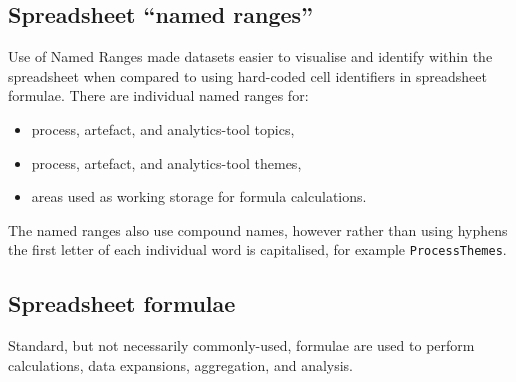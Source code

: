 \subsection{Spreadsheet ``named ranges''}
Use of Named Ranges made datasets easier to visualise and identify within the spreadsheet when compared to using hard-coded cell identifiers in spreadsheet formulae. There are individual named ranges for:
\begin{itemize}
    \item process, artefact, and analytics-tool topics,
    \item process, artefact, and analytics-tool themes,
    \item areas used as working storage for formula calculations.
\end{itemize}

The named ranges also use compound names, however rather than using hyphens the first letter of each individual word is capitalised, for example \texttt{ProcessThemes}.

\subsection{Spreadsheet formulae}
Standard, but not necessarily commonly-used, formulae are used to perform calculations, data expansions, aggregation, and analysis. 

